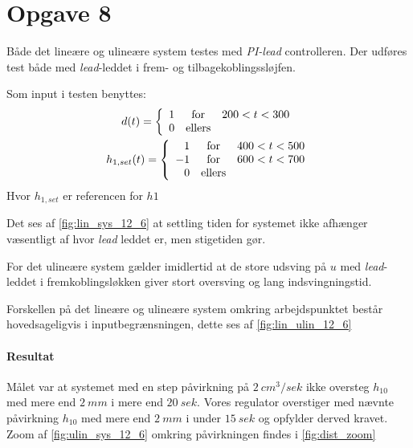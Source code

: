 \section{Opgave 8}
Både det lineære og ulineære system testes med \emph{PI-lead} controlleren.
Der udføres test både med \emph{lead}-leddet i frem- og tilbagekoblingssløjfen.

Som input i testen benyttes:
\begin{gather*}
d(t) = \left\{\begin{array}{r c l}
1 & \mbox{for} & 200<t<300\\
0 & \mbox{ellers} & 
\end{array}\right.\\
h_{1, set}(t) = \left\{\begin{array}{r c l}
 1 & \mbox{for} & 400<t<500\\
-1 & \mbox{for} & 600<t<700\\
 0 & \mbox{ellers} & 
\end{array}\right.\\
\end{gather*}
Hvor $h_{1, set}$ er referencen for $h1$

Det ses af \ref{fig:lin_sys_12_6} at settling tiden for systemet ikke afhænger
væsentligt af hvor \emph{lead} leddet er, men stigetiden gør.

For det ulineære system gælder imidlertid at de store udsving på $u$ med
\emph{lead}-leddet i fremkoblingsløkken giver stort oversving og lang
indsvingningstid.

Forskellen på det lineære og ulineære system omkring arbejdspunktet består
hovedsageligvis i inputbegrænsningen, dette ses af \ref{fig:lin_ulin_12_6}

\paragraph{Resultat}
	Målet var at systemet med en step påvirkning på $2~cm^3/sek$ ikke oversteg
	$h_{10}$ med mere end $2~mm$ i mere end $20~sek$. Vores regulator overstiger
	med nævnte påvirkning $h_{10}$ med mere end $2~mm$ i under $15~sek$ og opfylder derved
	kravet. Zoom af \ref{fig:ulin_sys_12_6} omkring påvirkningen findes i
	\ref{fig:dist_zoom}




